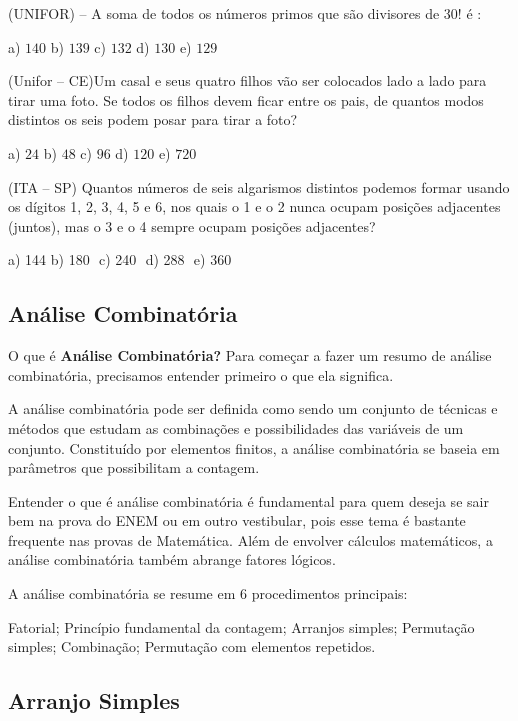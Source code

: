 \begin{multicols*}{2}
	\execnum  (UNIFOR)  --  A soma de todos os números primos que são divisores de 30! é :

	a) $140 $ b) $139 $ c) $132 $ d) $130 $ e) $129 $

	\execnum  (Unifor -- CE)Um casal e seus quatro filhos vão ser colocados lado a lado para tirar uma foto. Se todos os filhos devem ficar entre os pais, de quantos modos distintos os seis podem posar para tirar a foto?

	a) $24 $ b) $48 $ c) $96 $ d) $120 $ e) $720 $

	\execnum  (ITA -- SP) Quantos números de seis algarismos distintos podemos formar usando os dígitos 1, 2, 3, 4, 5 e 6, nos quais o 1 e o 2 nunca ocupam posições adjacentes (juntos), mas o 3 e o 4 sempre ocupam posições adjacentes?

	a) 144$ $ b) 180 $ $ c) 240 $ $ d) 288 $ $ e) 360


	\subsection*{Análise Combinatória}


	O que é \textbf{Análise Combinatória?}
	Para começar a fazer um resumo de análise combinatória, precisamos entender primeiro o que ela significa.

	A análise combinatória pode ser definida como sendo um conjunto de técnicas e métodos que estudam as combinações e possibilidades das variáveis de um conjunto. Constituído por elementos finitos, a análise combinatória se baseia em parâmetros que possibilitam a contagem.

	Entender o que é análise combinatória é fundamental para quem deseja se sair bem na prova do ENEM ou em outro vestibular, pois esse tema é bastante frequente nas provas de Matemática. Além de envolver cálculos matemáticos, a análise combinatória também abrange fatores lógicos.

	A análise combinatória se resume em 6 procedimentos principais:

	Fatorial;
	Princípio fundamental da contagem;
	Arranjos simples;
	Permutação simples;
	Combinação;
	Permutação com elementos repetidos.

	\subsection*{Arranjo Simples}


\end{multicols*}
